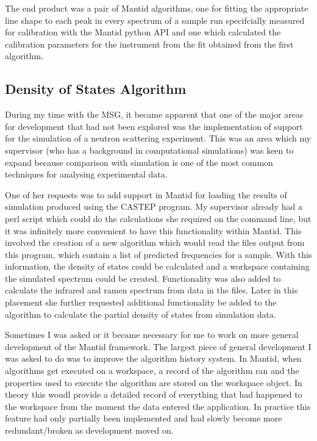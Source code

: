 \documentclass[paper=a4, fontsize=11pt]{scrartcl}	%
\numberwithin{equation}{section}															%
\numberwithin{figure}{section}																%
\numberwithin{table}{section}
\begin{document}
The end product was a pair of Mantid algorithms, one for fitting the
appropriate line shape to each peak in every spectrum of a sample run
specifcially measured for calibration with the Mantid python API and one
which calculated the calibration parameters for the instrument from the
fit obtained from the first algorithm.

\subsection{Density of States
Algorithm}\label{density-of-states-algorithm}

During my time with the MSG, it became apparent that one of the major
areas for development that had not been explored was the implementation
of support for the simulation of a neutron scattering experiment. This
was an area which my supervisor (who has a background in computational
simulations) was keen to expand because comparison with simulation is
one of the most common techniques for analysing experimental data.

One of her requests was to add support in Mantid for loading the results
of simulation produced using the CASTEP program. My supervisor already
had a perl script which could do the calculations she required on the
command line, but it was infinitely more convenient to have this
functionality within Mantid. This involved the creation of a new
algorithm which would read the files output from this program, which
contain a list of predicted frequencies for a sample. With this
information, the density of states could be calculated and a workspace
containing the simulated spectrum could be created. Functionality was
also added to calculate the infrared and ramen spectrum from data in the
files. Later in this placement she further requested additional
functionality be added to the algorithm to calculate the partial density
of states from simulation data.


Sometimes I was asked or it became necessary for me to work on more
general development of the Mantid framework. The largest piece of
general development I was asked to do was to improve the algorithm
history system. In Mantid, when algorithms get executed on a workspace,
a record of the algorithm ran and the properties used to execute the
algorithm are stored on the workspace object. In theory this woudl
provide a detailed record of everything that had happened to the
workspace from the moment the data entered the application. In practice
this feature had only partially been implemented and had slowly become
more redundant/broken as development moved on.
\end{document}
